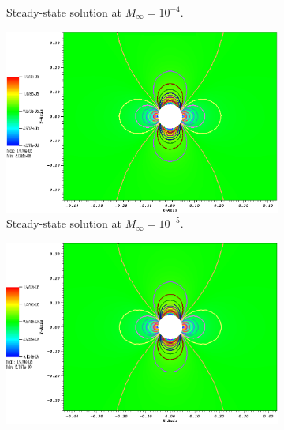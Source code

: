 \documentclass[preprint,10pt]{elsarticle}
\begin{document}
\begin{figure}[H]
\begin{subfigure}[b]{0.495\textwidth}
                \caption{Steady-state solution at $M_{\infty}=10^{-4}$.}
                \label{fig:cyl_1em4}
        \end{subfigure}    
        \begin{subfigure}[b]{0.495\textwidth}
                \centering
                \includegraphics[width=\textwidth]{CylinderMach1em5ZoomIn.png}
                \caption{Steady-state solution at $M_{\infty}=10^{-5}$.}
                \label{fig:cyl_1em5}
        \end{subfigure}
        \begin{subfigure}[b]{0.495\textwidth}
                \centering
                \includegraphics[width=\textwidth]{CylinderMach1em6ZoomIn.png}

\end{subfigure}
\end{figure}
\end{document}
